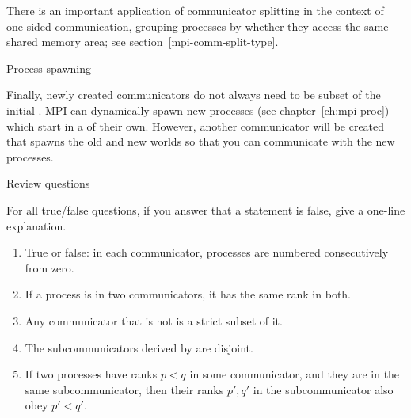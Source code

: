 There is an important application of communicator splitting in the
context of one-sided communication, grouping processes by whether they
access the same shared memory area; see section~\ref{mpi-comm-split-type}.

 {Process spawning}

Finally, newly created communicators do not always need to be subset
of the initial .
MPI can dynamically spawn new processes (see chapter~\ref{ch:mpi-proc})
which start in a  of their own.
However, another communicator will be created that spawns the old and new worlds
so that you can communicate with the new processes.







\newpage
{} {Review questions}

For all true/false questions, if you answer that a statement is false,
give a one-line explanation.

\begin{enumerate}

\item True or false: in each communicator, processes are numbered consecutively from zero.

\item If a process is in two communicators, it has the same rank in
both.

\item Any communicator that is not  is a strict subset of it.

\item The subcommunicators derived by 
  are disjoint.

\item If two processes have ranks $p<q$ in some communicator,
  and they are in the same subcommunicator,
  then their ranks $p',q'$ in the subcommunicator also obey $p'<q'$.
\end{enumerate}





